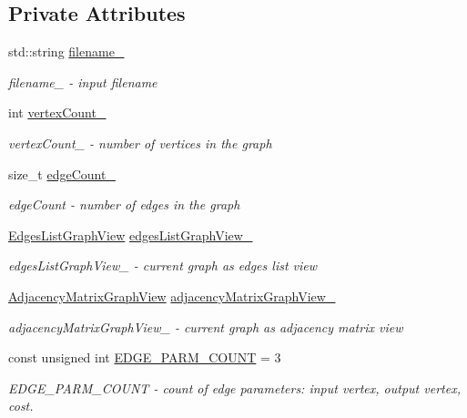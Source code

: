 \subsection*{Private Attributes}
\begin{DoxyCompactItemize}
\item 
std\+::string \hyperlink{a00007_a49e700993aec96bffaa4728eca205731_a49e700993aec96bffaa4728eca205731}{filename\+\_\+}
\begin{DoxyCompactList}\small\item\em filename\+\_\+ -\/ input filename \end{DoxyCompactList}\item 
int \hyperlink{a00007_ae1613c30ca3542a05340fb9b355ed994_ae1613c30ca3542a05340fb9b355ed994}{vertex\+Count\+\_\+}
\begin{DoxyCompactList}\small\item\em vertex\+Count\+\_\+ -\/ number of vertices in the graph \end{DoxyCompactList}\item 
size\+\_\+t \hyperlink{a00007_a8e9f0fc598b4370e04a32b926c9baf81_a8e9f0fc598b4370e04a32b926c9baf81}{edge\+Count\+\_\+}
\begin{DoxyCompactList}\small\item\em edge\+Count -\/ number of edges in the graph \end{DoxyCompactList}\item 
\hyperlink{a00037_aa7134896d837083f384364b56a32bb49_aa7134896d837083f384364b56a32bb49}{Edges\+List\+Graph\+View} \hyperlink{a00007_ab85998431c78d73435592bc472244b5d_ab85998431c78d73435592bc472244b5d}{edges\+List\+Graph\+View\+\_\+}
\begin{DoxyCompactList}\small\item\em edges\+List\+Graph\+View\+\_\+ -\/ current graph as edges list view \end{DoxyCompactList}\item 
\hyperlink{a00037_af657481a4b0a05546de6e9c1023bd9f5_af657481a4b0a05546de6e9c1023bd9f5}{Adjacency\+Matrix\+Graph\+View} \hyperlink{a00007_ac8870c2e19f956a34ca926a8f8ec43c7_ac8870c2e19f956a34ca926a8f8ec43c7}{adjacency\+Matrix\+Graph\+View\+\_\+}
\begin{DoxyCompactList}\small\item\em adjacency\+Matrix\+Graph\+View\+\_\+ -\/ current graph as adjacency matrix view \end{DoxyCompactList}\item 
const unsigned int \hyperlink{a00007_ac15969ca7cebe4751ebfc0b4c5f4e060_ac15969ca7cebe4751ebfc0b4c5f4e060}{E\+D\+G\+E\+\_\+\+P\+A\+R\+M\+\_\+\+C\+O\+U\+NT} = 3
\begin{DoxyCompactList}\small\item\em E\+D\+G\+E\+\_\+\+P\+A\+R\+M\+\_\+\+C\+O\+U\+NT -\/ count of edge parameters\+: input vertex, output vertex, cost. \end{DoxyCompactList}\end{DoxyCompactItemize}


